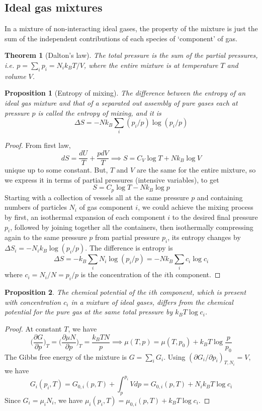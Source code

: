 \documentclass[a4paper]{article}
\theoremstyle{new}
\newtheorem{thm}{Theorem}[section]
\newtheorem{prop}{Proposition}[section]
\begin{document}
\subsection{Ideal gas mixtures}
In a mixture of non-interacting ideal gases, the property of the mixture is just the sum of the independent contributions of each species of `component' of gas. 
\begin{thm}[Dalton's law]
The total pressure is the sum of the partial pressures, i.e. $p=\sum_ip_i=N_ik_BT/V$, where the entire mixture is at temperature $T$ and volume $V$.
\end{thm}
\begin{prop}[Entropy of mixing]
The difference between the entropy of an ideal gas mixture and that of a separated out assembly of pure gases each at pressure $p$ is called the entropy of mixing, and it is
$$\Delta S=-Nk_B\sum_i(p_i/p)\log(p_i/p)$$
\end{prop}
\begin{proof}
From first law,
$$dS=\frac{dU}{T}+\frac{pdV}{T}\implies S=C_V\log T+Nk_B\log V$$
unique up to some constant. But, $T$ and $V$ are the same for the entire mixture, so we express it in terms of partial pressures (intensive variables), to get
$$S=C_p\log T-Nk_B\log p$$
Starting with a collection of vessels all at the same pressure $p$ and containing numbers of particles $N_i$ of gas component $i$, we could achieve the mixing process by first, an isothermal expansion of each component $i$ to the desired final pressure $p_i$, followed by joining together all the containers, then isothermally compressing again to the same pressure $p$ from partial pressure $p_i$, its entropy changes by $\Delta S_i=-N_ik_B\log(p_i/p)$. The difference is entropy is
$$\Delta S=-k_B\sum_iN_i\log(p_i/p)=-Nk_B\sum_ic_i\log c_i$$
where $c_i=N_i/N=p_i/p$ is the concentration of the $i$th component.
\end{proof}
\begin{prop}
The chemical potential of the $i$th component, which is present with concentration $c_i$ in a mixture of ideal gases, differs from the chemical potential for the pure gas at the same total pressure by $k_BT\log c_i$. 
\end{prop}
\begin{proof}
At constant $T$, we have
$$\bigg(\frac{\partial G}{\partial p}\bigg)_T=\bigg(\frac{\partial\mu N}{\partial p}\bigg)_T=\frac{k_BTN}{p}\implies\mu (T,p)=\mu(T,p_0)+k_BT\log\frac{p}{p_0}$$
The Gibbs free energy of the mixture is $G=\sum_iG_i$. Using $(\partial G_i/\partial p_i)_{T,N_i}=V$, we have
$$G_i(p_i,T)=G_{0,i}(p,T)+\int_p^{p_i}Vdp=G_{0,i}(p,T)+N_ik_BT\log c_i$$
Since $G_i=\mu_iN_i$, we have $\mu_i(p_i,T)=\mu_{0,i}(p,T)+k_BT\log c_i$. 
\end{proof}
\newpage
\end{document}
